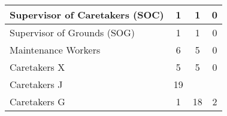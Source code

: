 \begin{tabular}{l|c|c|c|}
        \multicolumn{1}{|l|}{\cellcolor{ccfuschialight}Supervisor of Caretakers (SOC)} & 1                                                      & 1                                                                & 0                                                      \\ \hline
        \multicolumn{1}{|l|}{\cellcolor{ccfuschialight}Supervisor of Grounds (SOG)}    & 1                                                      & 1                                                                & 0                                                      \\ \hline
        \multicolumn{1}{|l|}{\cellcolor{ccfuschialight}Maintenance Workers}            & 6                                                      & 5                                                                & 0                                                       \\ \hline
        \multicolumn{1}{|l|}{\cellcolor{ccfuschialight}Caretakers X}                   & 5                                                      & 5                                                                & 0                                                      \\ \hline
        \multicolumn{1}{|l|}{\cellcolor{ccfuschialight}Caretakers J\tnote{1}}                   & 19                                                      &                                                                 &                                                         \\ \cline{1-2}
        \multicolumn{1}{|l|}{\cellcolor{ccfuschialight}Caretakers G}                   & 1                                                      & \multirow{-2}{*}{18}                                     & \multirow{-2}{*}{2}                           \\ \hline
        \end{tabular}
        
        